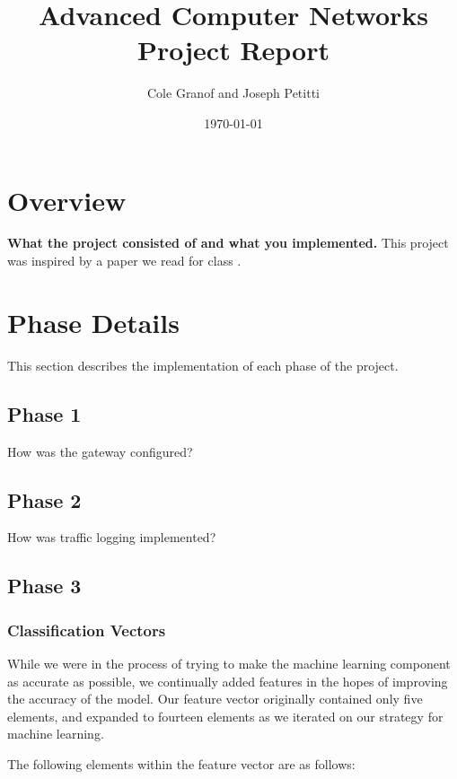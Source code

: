 \documentclass[a4paper, 11pt]{article} %
\title{Advanced Computer Networks Project Report}
\author{Cole Granof and Joseph Petitti}
\date{\today}
\begin{document}
\thispagestyle{empty}

\maketitle

\section{Overview}

\textbf{What the project consisted of and what you implemented.} This project
was inspired by a paper we read for class \cite{tscm16}.

\lipsum


\section{Phase Details}

This section describes the implementation of each phase of the project.

\subsection{Phase 1}

How was the gateway configured?

\lipsum

\subsection{Phase 2}

How was traffic logging implemented?

\subsection{Phase 3}

\subsubsection{Classification Vectors}

While we were in the process of trying to make the machine learning component as
accurate as possible, we continually added features in the hopes of improving the
accuracy of the model. Our feature vector originally contained only five elements,
and expanded to fourteen elements as we iterated on our strategy for machine learning.

The following elements within the feature vector are as follows:
\end{document}
